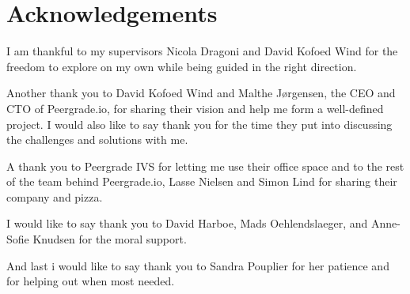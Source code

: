 \chapter{Acknowledgements}

I am thankful to my supervisors Nicola Dragoni and David Kofoed Wind for the freedom to explore on my own while being guided in the right direction.

Another thank you to David Kofoed Wind and Malthe Jørgensen, the CEO and CTO of Peergrade.io, for sharing their vision and help me form a well-defined project. I would also like to say thank you for the time they put into discussing the challenges and solutions with me.

A thank you to Peergrade IVS for letting me use their office space and to the rest of the team behind Peergrade.io, Lasse Nielsen and Simon Lind for sharing their company and pizza.

I would like to say thank you to David Harboe, Mads Oehlendslaeger, and Anne-Sofie Knudsen for the moral support.

And last i would like to say thank you to Sandra Pouplier for her patience and for helping out when most needed.

